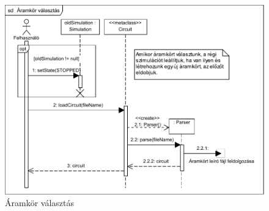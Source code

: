 \begin{figure}[H]
\begin{center}
\includegraphics{chapters/chapter03/seqdiagrams/aramkor_valasztas.pdf}
\caption{Áramkör választás}
\label{fig:aramkor_valasztas}
\end{center}
\end{figure}

